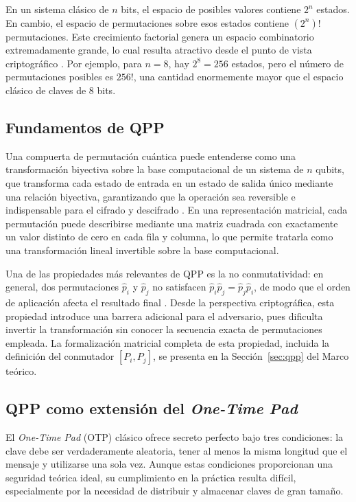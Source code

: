 En un sistema clásico de $n$ bits, el espacio de posibles valores contiene $2^n$ estados. En cambio, el espacio de permutaciones sobre esos estados contiene $(2^n)!$ permutaciones. Este crecimiento factorial genera un espacio combinatorio extremadamente grande, lo cual resulta atractivo desde el punto de vista criptográfico \cite{Kuang2020ShannonSpace}. Por ejemplo, para $n=8$, hay $2^8=256$ estados, pero el número de permutaciones posibles es $256!$, una cantidad enormemente mayor que el espacio clásico de claves de 8 bits.

\subsection{Fundamentos de QPP}

Una compuerta de permutación cuántica puede entenderse como una transformación biyectiva sobre la base computacional de un sistema de $n$ qubits, que transforma cada estado de entrada en un estado de salida único mediante una relación biyectiva, garantizando que la operación sea reversible e indispensable para el cifrado y descifrado \cite{Kuang2022QuantumCryptography}. En una representación matricial, cada permutación puede describirse mediante una matriz cuadrada con exactamente un valor distinto de cero en cada fila y columna, lo que permite tratarla como una transformación lineal invertible sobre la base computacional.

Una de las propiedades más relevantes de QPP es la no conmutatividad: en general, dos permutaciones $\hat{p}_i$ y $\hat{p}_j$ no satisfacen $\hat{p}_i \hat{p}_j = \hat{p}_j \hat{p}_i$, de modo que el orden de aplicación afecta el resultado final \cite{Kuang2024QPPGroup}. Desde la perspectiva criptográfica, esta propiedad introduce una barrera adicional para el adversario, pues dificulta invertir la transformación sin conocer la secuencia exacta de permutaciones empleada. La formalización matricial completa de esta propiedad, incluida la definición del conmutador $[P_i,P_j]$, se presenta en la Sección~\ref{sec:qpp} del Marco teórico.

\subsection{QPP como extensión del \textit{One-Time Pad}}

El \textit{One-Time Pad} (OTP) clásico ofrece secreto perfecto bajo tres condiciones: la clave debe ser verdaderamente aleatoria, tener al menos la misma longitud que el mensaje y utilizarse una sola vez. Aunque estas condiciones proporcionan una seguridad teórica ideal, su cumplimiento en la práctica resulta difícil, especialmente por la necesidad de distribuir y almacenar claves de gran tamaño.

